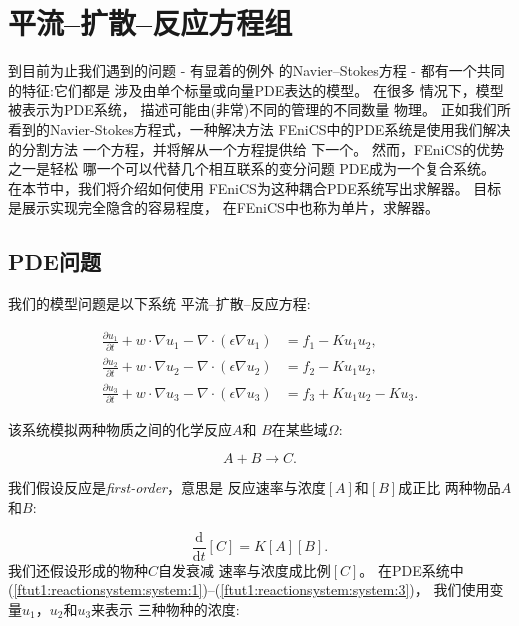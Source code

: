 
\section{平流--扩散--反应方程组}
\label{ftut1:reactionsystem}


到目前为止我们遇到的问题 - 有显着的例外
的Navier--Stokes方程 - 都有一个共同的特征:它们都是
涉及由单个标量或向量PDE表达的模型。 在很多
情况下，模型被表示为PDE系统，
描述可能由(非常)不同的管理的不同数量
物理。 正如我们所看到的Navier-Stokes方程式，一种解决方法
FEniCS中的PDE系统是使用我们解决的分割方法
一个方程，并将解从一个方程提供给
下一个。 然而，FEniCS的优势之一是轻松
哪一个可以代替几个相互联系的变分问题
PDE成为一个复合系统。 在本节中，我们将介绍如何使用
FEniCS为这种耦合PDE系统写出求解器。
目标是展示实现完全隐含的容易程度，
在FEniCS中也称为单片，求解器。


\subsection{PDE问题}

我们的模型问题是以下系统
平流--扩散--反应方程:

\begin{align}
  \label{ftut1:reactionsystem:system:1}
  \frac{\partial u_1}{\partial t} +
  w \cdot \nabla u_1 - \nabla\cdot(\epsilon\nabla u_1)
    &= f_1 -K u_1 u_2, \\
  \label{ftut1:reactionsystem:system:2}
  \frac{\partial u_2}{\partial t} +
  w \cdot \nabla u_2 - \nabla\cdot(\epsilon\nabla u_2)
    &= f_2 -K u_1 u_2, \\
  \label{ftut1:reactionsystem:system:3}
  \frac{\partial u_3}{\partial t} +
  w \cdot \nabla u_3 - \nabla\cdot(\epsilon\nabla u_3)
    &= f_3 + K u_1 u_2 - K u_3.
\end{align}

该系统模拟两种物质之间的化学反应$A$和
$B$在某些域$\Omega$:

\[
  A + B \rightarrow C.
\]

我们假设反应是\emph{first-order}，意思是
反应速率与浓度$[A]$和$[B]$成正比
两种物品$A$和$B$:

\[
  \frac{\mathrm{d}}{\mathrm{d}t} [C] = K [A] [B].
\]
我们还假设形成的物种$C$自发衰减
速率与浓度成比例$[C]$。 在PDE系统中
(\ref{ftut1:reactionsystem:system:1})--(\ref{ftut1:reactionsystem:system:3})，
我们使用变量$u_1$，$u_2$和$u_3$来表示
三种物种的浓度:


